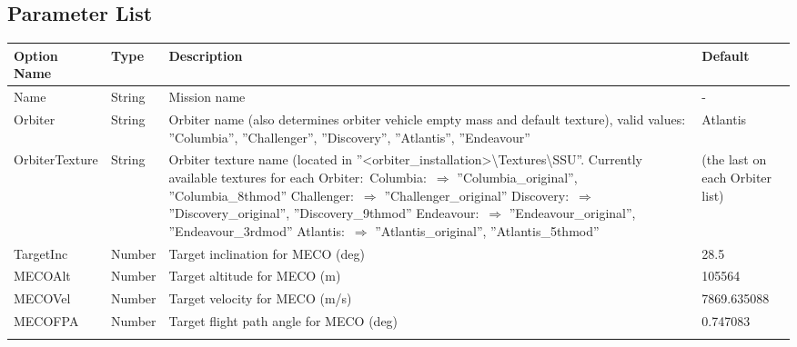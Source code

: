 \documentclass[Space_Shuttle_Ultra_Manual.tex]{subfiles}
\begin{document}
\newpage

\subsection{Parameter List}
  \begin{longtable}{|l|p{1.5cm}|p{7.5cm}|p{2.0cm}|}
	\hline
	\rule{0pt}{2ex}
	\textbf{Option Name} & \textbf{Type} & \textbf{Description} & \textbf{Default}\\
	\hline
	\rule{0pt}{2ex}
	Name & String & Mission name & -\\
	\hline
	\rule{0pt}{2ex}
	Orbiter & String & Orbiter name (also determines orbiter vehicle empty mass and default texture), valid values$\colon$ ''Columbia'', ''Challenger'', ''Discovery'', ''Atlantis'', ''Endeavour'' & Atlantis\\
	\hline
	\rule{0pt}{2ex}
	OrbiterTexture & String & Orbiter texture name (located in ''<orbiter\_installation>\textbackslash Textures\textbackslash SSU''. Currently available textures for each Orbiter$\colon$ \newline
Columbia$\colon$ \newline
$\Rightarrow$ ''Columbia\_original'', ''Columbia\_8thmod''\newline
Challenger$\colon$\newline
$\Rightarrow$ ''Challenger\_original''\newline
Discovery$\colon$\newline
$\Rightarrow$ ''Discovery\_original'', ''Discovery\_9thmod''\newline
Endeavour$\colon$\newline
$\Rightarrow$ ''Endeavour\_original'', ''Endeavour\_3rdmod''\newline
Atlantis$\colon$\newline
$\Rightarrow$ ''Atlantis\_original'', ''Atlantis\_5thmod''	& (the last on each Orbiter list)\\
	\hline
	\rule{0pt}{2ex}
	TargetInc & Number & Target inclination for MECO (deg) & 28.5\\
	\hline
	\rule{0pt}{2ex}
	MECOAlt & Number & Target altitude for MECO (m) & 105564\\
	\hline
	\rule{0pt}{2ex}
	MECOVel & Number & Target velocity for MECO (m/s) & 7869.635088\\
	\hline
	\rule{0pt}{2ex}
	MECOFPA & Number & Target flight path angle for MECO (deg) & 0.747083\\
	\hline
	\rule{0pt}{2ex}

\end{longtable}
\end{document}
